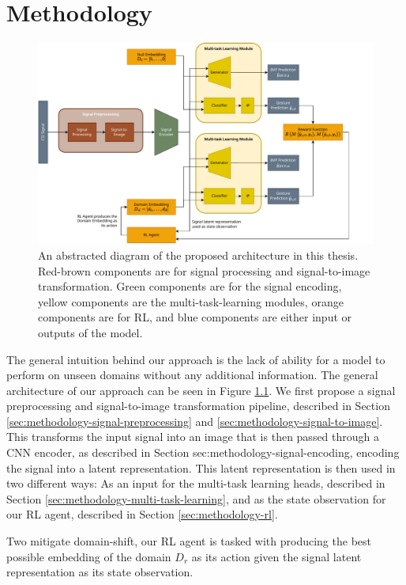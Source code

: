 \chapter{Methodology}\label{chapter:methodology}

\begin{figure}
	\centering
	\includegraphics[width=\linewidth]{figures/arch_diagram.pdf}
	\caption{An abstracted diagram of the proposed architecture in this thesis. Red-brown components are for signal processing and signal-to-image transformation. Green components are for the signal encoding, yellow components are the multi-task-learning modules, orange components are for RL, and blue components are either input or outputs of the model.}
	\label{fig:arch-diagram}
\end{figure}

The general intuition behind our approach is the lack of ability for a model to perform on unseen domains without any additional information.
The general architecture of our approach can be seen in Figure \ref{fig:arch-diagram}.
We first propose a signal preprocessing and signal-to-image transformation pipeline, described in Section \ref{sec:methodology-signal-preprocessing} and \ref{sec:methodology-signal-to-image}.
This transforms the input signal into an image that is then passed through a CNN encoder, as described in Section {sec:methodology-signal-encoding}, encoding the signal into a latent representation.
This latent representation is then used in two different ways: As an input for the multi-task learning heads, described in Section \ref{sec:methodology-multi-task-learning}, and as the state observation for our RL agent, described in Section \ref{sec:methodology-rl}.

Two mitigate domain-shift, our RL agent is tasked with producing the best possible embedding of the domain $D_{r}$ as its action given the signal latent representation as its state observation.

